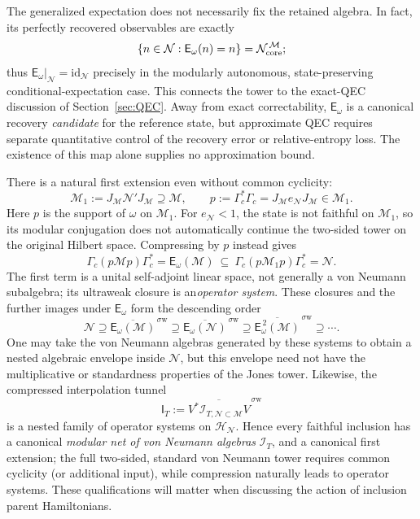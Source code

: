 \documentclass[a4paper,11pt]{article}
\theoremstyle{definition}
\newcommand{\mN}{\mathcal{N}}
\newcommand{\mI}{\mathcal{I}}
\newcommand{\mH}{\mathcal{H}}
\newcommand{\mM}{\mathcal{M}}
\begin{document}
The generalized expectation does not necessarily fix the retained
algebra. In fact, its perfectly recovered observables are exactly
\begin{equation}
 \{n\in\mN:\mathsf E_\omega(n)=n\}
 =\mN_{\rm core}^{\,\mM};
 \label{eq:interpolation-Petz-fixed-core}
\end{equation}
thus $\mathsf E_\omega|_{\mN}=\mathrm{id}_{\mN}$ precisely in the
modularly autonomous, state-preserving conditional-expectation case.
This connects the tower to the exact-QEC discussion of
Section~\ref{sec:QEC}. Away from exact correctability,
$\mathsf E_\omega$ is a canonical recovery \emph{candidate} for the
reference state, but approximate QEC requires separate quantitative
control of the recovery error or relative-entropy loss. The existence
of this map alone supplies no approximation bound.

There is a natural first extension even without common cyclicity:
\begin{equation}
 \mM_1:=J_{\mM}\mN'J_{\mM}\supseteq\mM,\qquad
 p:=\Gamma_c^*\Gamma_c=J_{\mM}e_{\mN}J_{\mM}\in\mM_1.
 \label{eq:interpolation-compressed-extension}
\end{equation}
Here $p$ is the support of $\omega$ on $\mM_1$. For
$e_{\mN}<1$, the state is not faithful on $\mM_1$, so its
modular conjugation does not automatically continue the two-sided
tower on the original Hilbert space. Compressing by $p$ instead gives
\begin{equation}
 \boxed{\quad
 \Gamma_c(p\mM p)\Gamma_c^*=\mathsf E_\omega(\mM)
 \ \subseteq\ 
 \Gamma_c(p\mM_1p)\Gamma_c^*=\mN .\quad}
 \label{eq:interpolation-compressed-system}
\end{equation}
The first term is a unital self-adjoint linear space, not generally a
von Neumann subalgebra; its ultraweak closure is an\emph{operator system}. These closures and the further images
under $\mathsf E_\omega$ form the descending order
\begin{equation}
 \mN\supseteq
 \overline{\mathsf E_\omega(\mM)}^{\,\sigma\mathrm w}
 \supseteq\overline{\mathsf E_\omega(\mN)}^{\,\sigma\mathrm w}
 \supseteq\overline{\mathsf E_\omega^{\,2}(\mM)}^{\,\sigma\mathrm w}
 \supseteq\cdots.
 \label{eq:interpolation-operator-systems}
\end{equation}
One may take the von Neumann algebras generated by these systems to
obtain a nested algebraic envelope inside $\mN$, but this envelope
need not have the multiplicative or standardness properties of the
Jones tower. Likewise, the compressed interpolation tunnel
\begin{equation}
 \mathsf I_T:=\overline{V^*\mI_{T,\mN\subset\mM}V}^{\,\sigma\mathrm w}
 \label{eq:interpolation-compressed-net}
\end{equation}
is a nested family of operator systems on $\mH_{\mN}$.
Hence every faithful inclusion has a canonical \emph{modular net of
von Neumann algebras} $\mI_T$, and a canonical first extension;
the full two-sided, standard von Neumann tower requires common
cyclicity (or additional input), while compression naturally leads
to operator systems. These qualifications will matter when discussing
the action of inclusion parent Hamiltonians.
\end{document}

